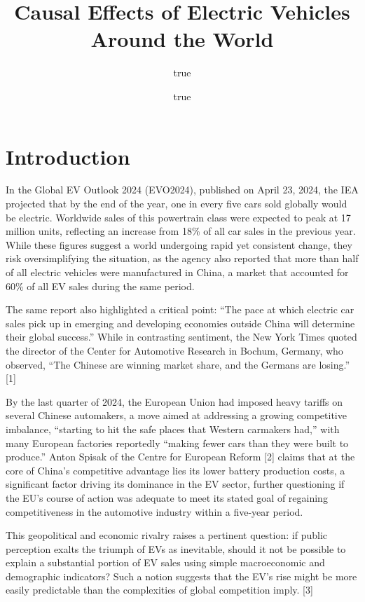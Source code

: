 \documentclass[
]{article}
\title{Causal Effects of Electric Vehicles Around the World}
\author{true \and true}
\date{}
\begin{document}
\maketitle

\section{\texorpdfstring{\textbf{Introduction}}{Introduction}}\label{introduction}

In the Global EV Outlook 2024 (EVO2024), published on April 23, 2024,
the IEA projected that by the end of the year, one in every five cars
sold globally would be electric. Worldwide sales of this powertrain
class were expected to peak at 17 million units, reflecting an increase
from 18\% of all car sales in the previous year. While these figures
suggest a world undergoing rapid yet consistent change, they risk
oversimplifying the situation, as the agency also reported that more
than half of all electric vehicles were manufactured in China, a market
that accounted for 60\% of all EV sales during the same period.

The same report also highlighted a critical point: ``The pace at which
electric car sales pick up in emerging and developing economies outside
China will determine their global success.'' While in contrasting
sentiment, the New York Times quoted the director of the Center for
Automotive Research in Bochum, Germany, who observed, ``The Chinese are
winning market share, and the Germans are losing.'' {[}1{]}

By the last quarter of 2024, the European Union had imposed heavy
tariffs on several Chinese automakers, a move aimed at addressing a
growing competitive imbalance, ``starting to hit the safe places that
Western carmakers had,'' with many European factories reportedly
``making fewer cars than they were built to produce.'' Anton Spisak of
the Centre for European Reform {[}2{]} claims that at the core of
China's competitive advantage lies its lower battery production costs, a
significant factor driving its dominance in the EV sector, further
questioning if the EU's course of action was adequate to meet its stated
goal of regaining competitiveness in the automotive industry within a
five-year period.

This geopolitical and economic rivalry raises a pertinent question: if
public perception exalts the triumph of EVs as inevitable, should it not
be possible to explain a substantial portion of EV sales using simple
macroeconomic and demographic indicators? Such a notion suggests that
the EV's rise might be more easily predictable than the complexities of
global competition imply. {[}3{]}
\end{document}
